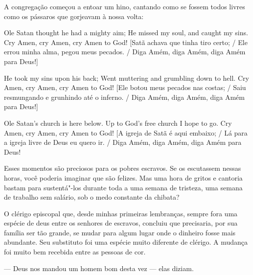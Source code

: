 A congregação começou a entoar um hino,
cantando como se fossem todos livres como os pássaros que gorjeavam à
nossa volta:

Ole Satan thought he had a mighty aim; He missed my soul, and caught my
sins. Cry Amen, cry Amen, cry Amen to God! {[}Satã achava que tinha tiro
certo; / Ele errou minha alma, pegou meus pecados. / Diga Amém, diga
Amém, diga Amém para Deus!{]}

He took my sins upon his back; Went muttering and grumbling down to
hell. Cry Amen, cry Amen, cry Amen to God! {[}Ele botou meus pecados nas
costas; / Saiu resmungando e grunhindo até o inferno. / Diga Amém, diga
Amém, diga Amém para Deus!{]}

Ole Satan's church is here below. Up to God's free church I hope to go.
Cry Amen, cry Amen, cry Amen to God! {[}A igreja de Satã é aqui embaixo;
/ Lá para a igreja livre de Deus eu quero ir. / Diga Amém, diga Amém,
diga Amém para Deus!

Esses momentos são preciosos para os
pobres escravos. Se os escutassem nessas horas, você poderia imaginar
que são felizes. Mas uma hora de gritos e cantoria bastam para
sustentá"-los durante toda a uma semana de tristeza, uma semana de
trabalho sem salário, sob o medo constante da chibata?

O clérigo episcopal que, desde minhas
primeiras lembranças, sempre fora uma espécie de deus entre os senhores
de escravos, concluiu que precisaria, por sua família ser tão grande, se
mudar para algum lugar onde o dinheiro fosse mais abundante. Seu
substituto foi uma espécie muito diferente de clérigo. A mudança foi
muito bem recebida entre as pessoas de cor.

--- Deus nos mandou um homem bom desta vez --- elas diziam.

